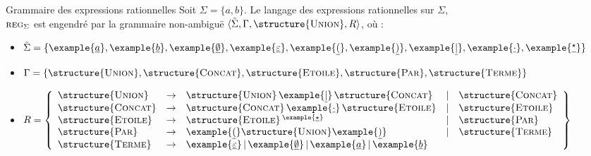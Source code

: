 
\begingroup

\begin{frame}{Grammaire des expressions rationnelles}
  \label{slide:grammaireRegex}
  Soit $\Sigma = \{a, b\}$. Le langage des expressions rationnelles sur $\Sigma$, \\$\textsc{reg}_\Sigma$ est engendré par la grammaire non-ambiguë
  $\langle \tilde\Sigma, \Gamma, \structure{\textsc{Union}}, R \rangle$, où :
  \begin{itemize}
  \item $\tilde\Sigma = \{\example{\underline{a}}, \example{\underline{b}}, \example{\underline{\emptyset}}, \example{\underline{\varepsilon}}, \example{\underline{(}}, \example{\underline{)}}, \example{\underline{|}}, \example{\underline{\cdot}}, \example{\underline{{}^\star}} \}$
  \item $\Gamma = \{\structure{\textsc{Union}}, \structure{\textsc{Concat}}, \structure{\textsc{Etoile}}, \structure{\textsc{Par}}, \structure{\textsc{Terme}}\}$
  \item $R =   \left\{\begin{array}{lllll}
    \structure{\textsc{Union}} &\rightarrow& \structure{\textsc{Union}} \, \example{\underline{|}} \, \structure{\textsc{Concat}} & | &  \structure{\textsc{Concat}} \\
    \structure{\textsc{Concat}} &\rightarrow& \structure{\textsc{Concat}} \, \example{\underline{\cdot}} \, \structure{\textsc{Etoile}} & | & \structure{\textsc{Etoile}} \\
    \structure{\textsc{Etoile}} &\rightarrow& \structure{\textsc{Etoile}}\,^{\example{\underline{\star}}} & | & \structure{\textsc{Par}} \\
    \structure{\textsc{Par}} &\rightarrow&  \example{\underline{(}} \structure{\textsc{Union}} \example{\underline{)}} & | &  \structure{\textsc{Terme}} \\
    \structure{\textsc{Terme}} &\rightarrow& \example{\underline{\varepsilon}} \,|\, \example{\underline{\emptyset}} \,|\, \example{\underline{a}} \,|\, \example{\underline{b}}  \\
  \end{array}\right\}$
  \end{itemize}


\end{frame}
